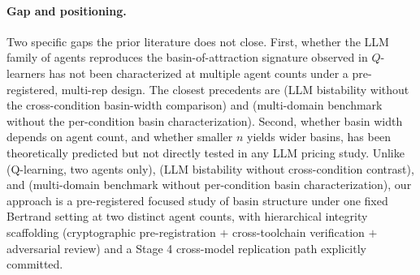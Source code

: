 \paragraph{Gap and positioning.}
Two specific gaps the prior literature does not close. First, whether the LLM family of agents reproduces the basin-of-attraction signature observed in $Q$-learners has not been characterized at multiple agent counts under a pre-registered, multi-rep design. The closest precedents are \citet{Cao_2026_llm_collusion} (LLM bistability without the cross-condition basin-width comparison) and \citet{Tailor_2025_whisper} (multi-domain benchmark without the per-condition basin characterization). Second, whether basin width depends on agent count, and whether smaller $n$ yields wider basins, has been theoretically predicted \citep{askenazi2024bounds,wunder_littman_babes_2010_qlearning_basin} but not directly tested in any LLM pricing study. Unlike \citet{calvano_etal_2020_ai_algorithmic_pricing_collusion} (Q-learning, two agents only), \citet{Cao_2026_llm_collusion} (LLM bistability without cross-condition contrast), and \citet{Tailor_2025_whisper} (multi-domain benchmark without per-condition basin characterization), our approach is a pre-registered focused study of basin structure under one fixed Bertrand setting at two distinct agent counts, with hierarchical integrity scaffolding (cryptographic pre-registration $+$ cross-toolchain verification $+$ adversarial review) and a Stage 4 cross-model replication path explicitly committed.
